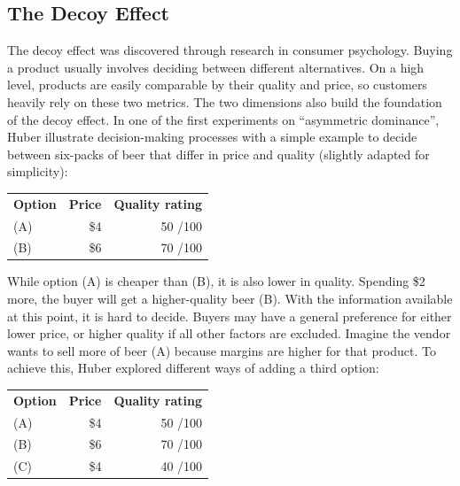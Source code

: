 \subsection{The Decoy Effect}
The decoy effect was discovered through research in consumer psychology. Buying a product usually involves deciding between different alternatives. On a high level, products are easily comparable by their quality and price, so customers heavily rely on these two metrics. The two dimensions also build the foundation of the decoy effect. In one of the first experiments on ``asymmetric dominance'', Huber \etal illustrate decision-making processes with a simple example to decide between six-packs of beer that differ in price and quality \cite{Huber1982AsymetricallyDominated} (slightly adapted for simplicity): 
\begin{table}[!h]
\begin{tabular}{lrr}
	\textbf{Option} & \textbf{Price} & \textbf{Quality rating}\\
	(A) & \$4 & 50 \small{/100}\\
	(B) & \$6 & 70 \small{/100}\\
\end{tabular}
\end{table}

While option (A) is cheaper than (B), it is also lower in quality. Spending \$2 more, the buyer will get a higher-quality beer (B). With the information available at this point, it is hard to decide. 
Buyers may have a general preference for either lower price, or higher quality if all other factors are excluded. Imagine the vendor wants to sell more of beer (A) because margins are higher for that product. To achieve this, Huber \etal explored different ways of adding a third option:
\begin{table}[!h]
\begin{tabular}{lrr}
	\textbf{Option} & \textbf{Price} & \textbf{Quality rating}\\
	(A) & \$4 & 50 \small{/100} \\
	(B) & \$6 & 70 \small{/100}\\
	(C) & \$4 & 40 \small{/100} \\
\end{tabular} 
\end{table}

